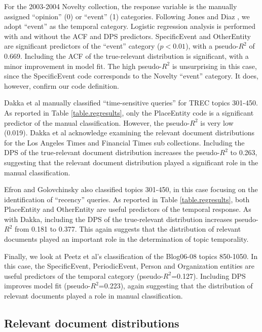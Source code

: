 \documentclass[runningheads,a4paper]{llncs}
\begin{document}
For the 2003-2004 Novelty collection, the response variable is the manually assigned ``opinion'' (0) or ``event'' (1) categories.  Following Jones and Diaz \cite{Jones2007}, we adopt ``event'' as the temporal category. Logistic regression analysis is performed with and without the ACF and DPS predictors.  SpecificEvent and OtherEntity are significant predictors of the ``event'' category ($p < 0.01$), with a pseudo-$R^2$ of 0.669. Including the ACF of the true-relevant distribution is significant, with a minor improvement in model fit. The high pseudo-$R^2$ is unsurprising in this case, since the SpecificEvent code corresponds to the Novelty ``event'' category. It does, however, confirm our code definition.

Dakka et al manually classified ``time-sensitive queries'' for TREC topics 301-450. As reported in Table \ref{table.regresults}, only the PlaceEntity code is a significant predictor of the manual classification. However, the pseudo-$R^2$ is very low (0.019).  Dakka et al acknowledge examining the relevant document distributions for the Los Angeles Times and Financial Times sub collections.  Including the DPS of the true-relevant document distribution increases the pseudo-$R^2$ to 0.263, suggesting that the relevant document distribution played a significant role in the manual classification.

Efron and Golovchinsky also classified topics 301-450, in this case focusing on the identification of ``recency'' queries. As reported in Table \ref{table.regresults}, both PlaceEntity and OtherEntity are useful predictors of the temporal response. As with Dakka, including the DPS of the true-relevant distribution increases pseudo-$R^2$ from 0.181 to 0.377. This again suggests that the distribution of relevant documents played an important role in the determination of topic temporality.

Finally, we look at Peetz et al's classification of the Blog06-08 topics 850-1050. In this case, the SpecificEvent, PeriodicEvent, Person and Organization entities are useful predictors of the temporal category (pseudo-$R^2$=0.127). Including DPS  improves model fit (pseudo-$R^2$=0.223), again suggesting that the distribution of relevant documents played a role in manual classification.

\subsection{Relevant document distributions}
\end{document}
